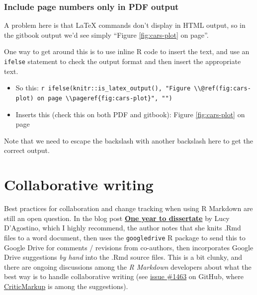 \documentclass[a4paper, nobind]{templates/ociamthesis}
\providecommand{\tightlist}{%
  \setlength{\itemsep}{0pt}\setlength{\parskip}{0pt}}
\begin{document}
\subsubsection{Include page numbers only in PDF output}\label{include-page-numbers-only-in-pdf-output}

A problem here is that LaTeX commands don't display in HTML output, so in the gitbook output we'd see simply ``Figure \ref{fig:cars-plot} on page''.

One way to get around this is to use inline R code to insert the text, and use an \texttt{ifelse} statement to check the output format and then insert the appropriate text.

\begin{itemize}
\tightlist
\item
  So this: \texttt{\textasciigrave{}r\ ifelse(knitr::is\_latex\_output(),\ "Figure\ \textbackslash{}\textbackslash{}@ref(fig:cars-plot)\ on\ page\ \textbackslash{}\textbackslash{}pageref\{fig:cars-plot\}",\ "")\textasciigrave{}}
\item
  Inserts this (check this on both PDF and gitbook): Figure \ref{fig:cars-plot} on page \pageref{fig:cars-plot}
\end{itemize}

Note that we need to escape the backslash with another backslash here to get the correct output.

\section{Collaborative writing}\label{collaborative-writing}

Best practices for collaboration and change tracking when using R Markdown are still an open question.
In the blog post \href{https://livefreeordichotomize.com/2018/09/14/one-year-to-dissertate/}{\textbf{One year to dissertate}} by Lucy D'Agostino, which I highly recommend, the author notes that she knits .Rmd files to a word document, then uses the \texttt{googledrive} R package to send this to Google Drive for comments / revisions from co-authors, then incorporates Google Drive suggestions \emph{by hand} into the .Rmd source files.
This is a bit clunky, and there are ongoing discussions among the \emph{R Markdown} developers about what the best way is to handle collaborative writing (see \href{https://github.com/rstudio/rmarkdown/issues/1463}{issue \#1463} on GitHub, where \href{http://criticmarkup.com}{CriticMarkup} is among the suggestions).
\end{document}
